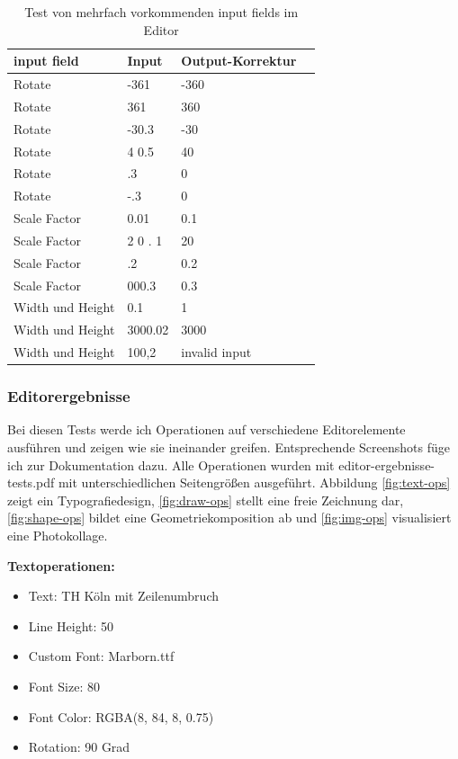 \begin{table}[!htbp]
	\centering
	\begin{tabular}{|p{4cm}|p{3cm}|p{3cm}|p{3cm}|}
		\hline
		\textbf{input field}	& \textbf{Input} 	& \textbf{Output-Korrektur}		\\ 
		\hline
		Rotate					& -361 						& -360  				\\
		Rotate					& 361 						& 360 					\\ 
		Rotate					& -30.3 					& -30  					\\
		Rotate					& 4 0.5 					& 40 					\\
		Rotate					& .3 						& 0 					\\ 
		Rotate					& -.3 						& 0 					\\ 
		Scale Factor			& 0.01						& 0.1 					\\
		Scale Factor			& 2 0 . 1					& 20 					\\
		Scale Factor			& .2						& 0.2 					\\
		Scale Factor			& 000.3						& 0.3 					\\
		Width und Height		& 0.1						& 1 					\\
		Width und Height		& 3000.02					& 3000 					\\
		Width und Height		& 100,2						& invalid input 		\\
		\hline
	\end{tabular}
	\caption{Test von mehrfach vorkommenden input fields im Editor}
	\label{table:editor-input}
\end{table}

\subsubsection{Editorergebnisse}
Bei diesen Tests werde ich Operationen auf verschiedene Editorelemente ausführen und zeigen wie sie ineinander greifen. Entsprechende Screenshots füge ich zur Dokumentation dazu. Alle Operationen wurden mit editor-ergebnisse-tests.pdf mit unterschiedlichen Seitengrößen ausgeführt. Abbildung \ref{fig:text-ops} zeigt ein Typografiedesign, \ref{fig:draw-ops} stellt eine freie Zeichnung dar, \ref{fig:shape-ops} bildet eine Geometriekomposition ab und \ref{fig:img-ops} visualisiert eine Photokollage.

\textbf{Textoperationen:}
\begin{itemize}
	\item Text: TH Köln mit Zeilenumbruch
	\item Line Height: 50
	\item Custom Font: Marborn.ttf
	\item Font Size: 80
	\item Font Color: RGBA(8, 84, 8, 0.75)
	\item Rotation: 90 Grad
\end{itemize}

